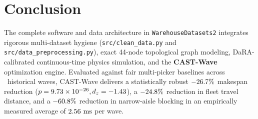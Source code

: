 \documentclass[11pt,a4paper]{article}
\begin{document}
\section{Conclusion}
The complete software and data architecture in \texttt{WarehouseDatasets2} integrates rigorous multi-dataset hygiene (\texttt{src/clean\_data.py} and \texttt{src/data\_preprocessing.py}), exact 44-node topological graph modeling, DaRA-calibrated continuous-time physics simulation, and the \textbf{CAST-Wave} optimization engine. Evaluated against fair multi-picker baselines across \BenchmarkWaves~historical waves, CAST-Wave delivers a statistically robust $-26.7\%$ makespan reduction ($p = 9.73 \times 10^{-26}, d_z = -1.43$), a $-24.8\%$ reduction in fleet travel distance, and a $-60.8\%$ reduction in narrow-aisle blocking in an empirically measured average of $2.56\text{ ms}$ per wave.
\end{document}
